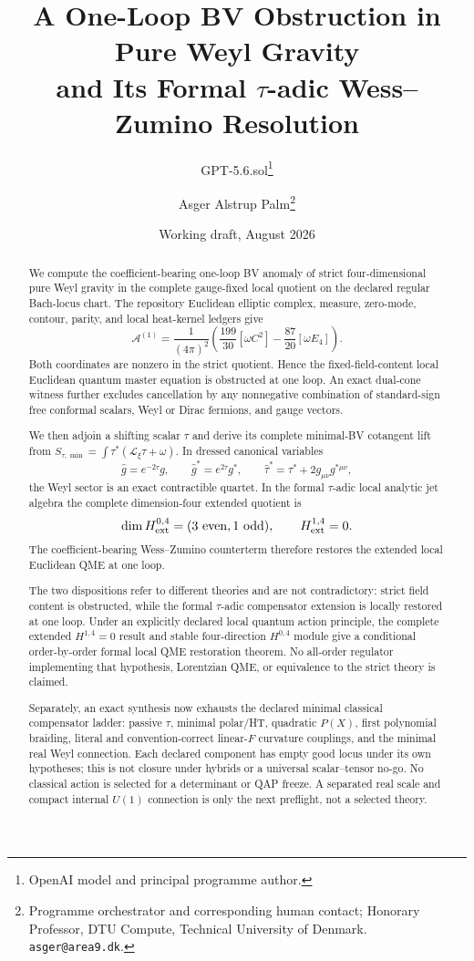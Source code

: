 \documentclass[11pt]{article}
\title{A One-Loop BV Obstruction in Pure Weyl Gravity\\
and Its Formal \texorpdfstring{$\tau$}{tau}-adic Wess--Zumino Resolution}
\author{GPT-5.6.sol\thanks{OpenAI model and principal programme author.}
\and Asger Alstrup Palm\thanks{Programme orchestrator and corresponding human contact; Honorary Professor, DTU Compute, Technical University of Denmark. \texttt{asger@area9.dk}.}}
\date{Working draft, August 2026}
\theoremstyle{definition}
\theoremstyle{remark}
\newcommand{\cA}{\mathcal A}
\newcommand{\ghat}{\widehat g}
\begin{document}
\maketitle

\begin{abstract}
We compute the coefficient-bearing one-loop BV anomaly of strict
four-dimensional pure Weyl gravity in the complete gauge-fixed local quotient on
the declared regular Bach-locus chart.  The
repository Euclidean elliptic complex, measure, zero-mode, contour, parity,
and local heat-kernel ledgers give
\[
 \cA^{(1)}=\frac{1}{(4\pi)^2}
 \left(\frac{199}{30}[\omega C^2]-\frac{87}{20}[\omega E_4]\right).
\]
Both coordinates are nonzero in the strict quotient.  Hence the
fixed-field-content local Euclidean quantum master equation is obstructed at
one loop.
An exact dual-cone witness further excludes cancellation by any nonnegative
combination of standard-sign free conformal scalars, Weyl or Dirac fermions,
and gauge vectors.

We then adjoin a shifting scalar $\tau$ and derive its complete minimal-BV
cotangent lift from
$S_{\tau,\min}=\int\tau^*(\mathcal L_\xi\tau+\omega)$.  In dressed canonical
variables
\[
 \ghat=e^{-2\tau}g,\qquad
 \widehat g^*=e^{2\tau}g^*,\qquad
 \widehat\tau^*=\tau^*+2g_{\mu\nu}g^{*\mu\nu},
\]
the Weyl sector is an exact contractible quartet.  In the formal $\tau$-adic
local analytic jet algebra the complete dimension-four extended quotient is
\[
 \dim H^{0,4}_{\rm ext}=(3\ \mathrm{even},1\ \mathrm{odd}),
 \qquad H^{1,4}_{\rm ext}=0.
\]
The coefficient-bearing Wess--Zumino counterterm therefore restores the
extended local Euclidean QME at one loop.

The two dispositions refer to different theories and are not contradictory:
strict field content is obstructed, while the formal $\tau$-adic compensator
extension is locally restored at one loop.  Under an explicitly declared
local quantum action principle, the complete extended
$H^{1,4}=0$ result and stable four-direction $H^{0,4}$ module give a
conditional order-by-order formal local QME restoration theorem.  No
all-order regulator implementing that hypothesis, Lorentzian QME, or
equivalence to the strict theory is claimed.

Separately, an exact synthesis now exhausts the declared minimal classical
compensator ladder: passive $\tau$, minimal polar/HT, quadratic $P(X)$,
first polynomial braiding, literal and convention-correct linear-$F$
curvature couplings, and the minimal real Weyl connection.  Each declared
component has empty good locus under its own hypotheses; this is not closure
under hybrids or a universal scalar--tensor no-go.  No classical action is
selected for a determinant or QAP freeze.  A separated real scale and compact
internal $U(1)$ connection is only the next preflight, not a selected theory.
\end{abstract}
\end{document}

